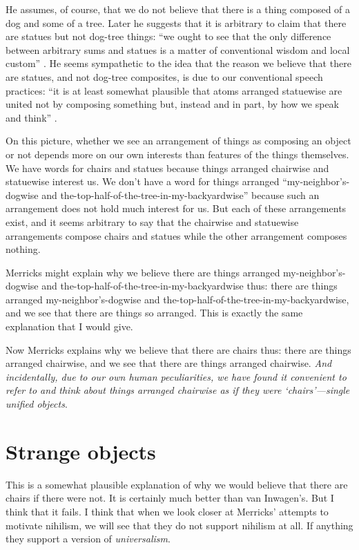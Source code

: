 \documentclass[11pt]{article}
\begin{document}
\begin{spacing}{1.25}
He assumes, of course, that we do not believe that there is a thing
composed of a dog and some of a tree.  Later he suggests that it is
arbitrary to claim that there are statues but not dog-tree things:
``we ought to see that the only difference between arbitrary sums and
statues is a matter of conventional wisdom and local custom''
\citeyearpar[75]{merricks2001a}.  He seems sympathetic to the idea
that the reason we believe that there are statues, and not dog-tree
composites, is due to our conventional speech practices: ``it is at
least somewhat plausible that atoms arranged statuewise are united not
by composing something but, instead and in part, by how we speak and
think'' \citeyearpar[121]{merricks2001a}.

On this picture, whether we see an arrangement of things as composing
an object or not depends more on our own interests than features of
the things themselves.  We have words for chairs and statues because
things arranged chairwise and statuewise interest us.  We don't have a
word for things arranged ``my-neighbor's-dogwise and
the-top-half-of-the-tree-in-my-backyardwise'' because such an
arrangement does not hold much interest for us.  But each of these
arrangements exist, and it seems arbitrary to say that the chairwise
and statuewise arrangements compose chairs and statues while the other
arrangement composes nothing.

Merricks might explain why we believe there are things arranged
my-neighbor's-dogwise and the-top-half-of-the-tree-in-my-backyardwise
thus: there are things arranged my-neighbor's-dogwise and
the-top-half-of-the-tree-in-my-backyardwise, and we see that there are
things so arranged.  This is exactly the same explanation that I would
give.

Now Merricks explains why we believe that there are chairs thus: there
are things arranged chairwise, and we see that there are things
arranged chairwise.  {\em And incidentally, due to our own human
  peculiarities, we have found it convenient to refer to and think
  about things arranged chairwise as if they were `chairs'---single
  unified objects}.

\section{Strange objects}
\label{dogbush}
This is a somewhat plausible explanation of why we would believe that
there are chairs if there were not.  It is certainly much better than
van Inwagen's.  But I think that it fails.  I think that when we look
closer at Merricks' attempts to motivate nihilism, we will see that
they do not support nihilism at all.  If anything they support a
version of {\em universalism}.


\end{spacing}
\end{document}
